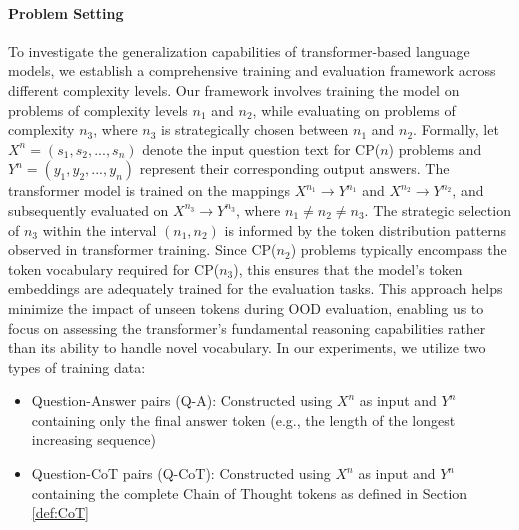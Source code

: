 \paragraph{Problem Setting}
To investigate the generalization capabilities of transformer-based language models, we establish a comprehensive training and evaluation framework across different complexity levels. Our framework involves training the model on problems of complexity levels $n_1$ and $n_2$, while evaluating on problems of complexity $n_3$, where $n_3$ is strategically chosen between $n_1$ and $n_2$. Formally, let $X^{n} = (s_1, s_2, ..., s_n)$ denote the input question text for CP($n$) problems and $Y^{n} = (y_1, y_2, ..., y_n)$ represent their corresponding output answers. The transformer model is trained on the mappings $X^{n_{1}} \rightarrow Y^{n_{1}}$ and $X^{n_{2}} \rightarrow Y^{n_{2}}$, and subsequently evaluated on $X^{n_{3}} \rightarrow Y^{n_{3}}$, where $n_1 \neq n_2 \neq n_3$.
The strategic selection of $n_3$ within the interval $(n_1, n_2)$ is informed by the token distribution patterns observed in transformer training. Since CP($n_2$) problems typically encompass the token vocabulary required for CP($n_3$), this ensures that the model's token embeddings are adequately trained for the evaluation tasks. This approach helps minimize the impact of unseen tokens during OOD evaluation, enabling us to focus on assessing the transformer's fundamental reasoning capabilities rather than its ability to handle novel vocabulary.
In our experiments, we utilize two types of training data:
\begin{itemize} \setlength{\itemsep}{-1pt}
    \item Question-Answer pairs (Q-A): Constructed using $X^n$ as input and $Y^n$ containing only the final answer token (e.g., the length of the longest increasing sequence)
    \item Question-CoT pairs (Q-CoT): Constructed using $X^n$ as input and $Y^n$ containing the complete Chain of Thought tokens as defined in Section \ref{def:CoT}
\end{itemize}

